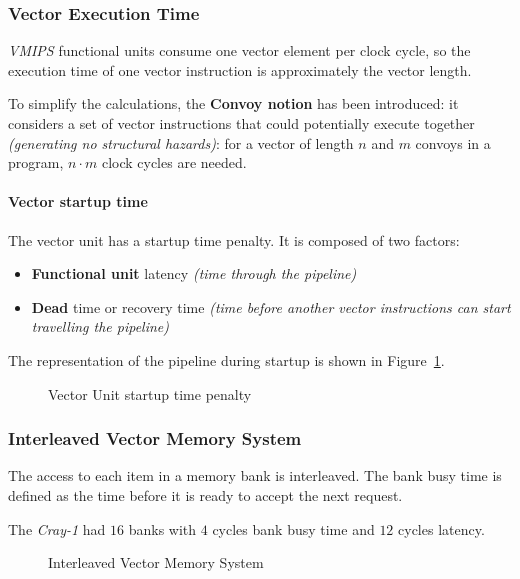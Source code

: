 \documentclass[english]{article}
\begin{document}
\subsubsection{Vector Execution Time}

\textit{VMIPS} functional units consume one vector element per clock cycle, so the execution time of one vector instruction is approximately the vector length.

To simplify the calculations, the \textbf{Convoy notion} has been introduced:
it considers a set of vector instructions that could potentially execute together \textit{(generating no structural hazards)}:
for a vector of length \(n\) and \(m\) convoys in a program, \(n \cdot m\) clock cycles are needed.

\paragraph{Vector startup time}

The vector unit has a startup time penalty.
It is composed of two factors:

\begin{itemize}
  \item \textbf{Functional unit} latency \textit{(time through the pipeline)}
  \item \textbf{Dead} time or recovery time \textit{(time before another vector instructions can start travelling the pipeline)}
\end{itemize}

The representation of the pipeline during startup is shown in Figure~\ref{fig:vector-unit-startup}.

\begin{figure}[htbp]
  \bigskip
  \centering
  \caption{Vector Unit startup time penalty}
  \label{fig:vector-unit-startup}
  \bigskip
\end{figure}

\subsubsection{Interleaved Vector Memory System}

The access to each item in a memory bank is interleaved.
The bank busy time is defined as the time before it is ready to accept the next request.

The \textit{Cray-1} had \(16\) banks with \(4\) cycles bank busy time and \(12\) cycles latency.

\begin{figure}[htbp]
  \bigskip
  \centering
  \caption{Interleaved Vector Memory System}
  \label{fig:interleaved-vector-memory-system}
  \bigskip
\end{figure}
\end{document}
